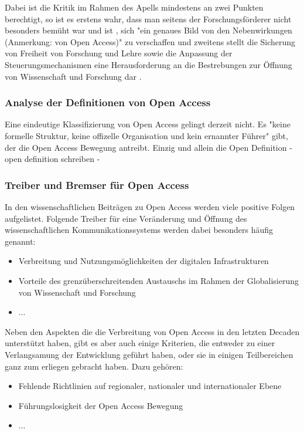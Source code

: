 Dabei ist die Kritik im Rahmen des Apells mindestens an zwei Punkten berechtigt, so ist es erstens wahr, dass man seitens der Forschungsförderer nicht besonders bemüht war und ist \cite{suchen}, sich "ein genaues Bild von den Nebenwirkungen (Anmerkung: von Open Access)" \cite{Reuss_2009} zu verschaffen und zweitens stellt die Sicherung von Freiheit von Forschung und Lehre sowie die Anpassung der Steuerungsmechanismen eine Herausforderung an die Bestrebungen zur Öffnung von Wissenschaft und Forschung dar \cite{suchen}.

\subsubsection{Analyse der Definitionen von Open Access} 

Eine eindeutige Klassifizierung von Open Access gelingt derzeit nicht. Es "keine formelle Struktur, keine offizelle Organisation und kein ernannter Führer" gibt, der die Open Access Bewegung antreibt\cite{poynder_2011_suber}. Einzig und allein die Open Definition - open definition schreiben -

\subsubsection{Treiber und Bremser für Open Access} 

In den wissenschaftlichen Beiträgen zu Open Access werden viele positive Folgen aufgelistet. Folgende Treiber für eine Veränderung und Öffnung des wissenschaftlichen Kommunikationssystems werden dabei besonders häufig genannt:

\begin{itemize}
\item Verbreitung und Nutzungsmöglichkeiten der digitalen Infrastrukturen
\item Vorteile des grenzüberschreitenden Austauschs im Rahmen der Globalisierung von Wissenschaft und Forschung
\item ...
\end{itemize}

Neben den Aspekten die die Verbreitung von Open Access in den letzten Decaden unterstützt haben, gibt es aber auch einige Kriterien, die entweder zu einer Verlangsamung der Entwicklung geführt haben, oder sie in einigen Teilbereichen ganz zum erliegen gebracht haben. Dazu gehören:

\begin{itemize}
\item Fehlende Richtlinien auf regionaler, nationaler und internationaler Ebene
\item Führungslosigkeit der Open Access Bewegung
\item ...
\end{itemize}

